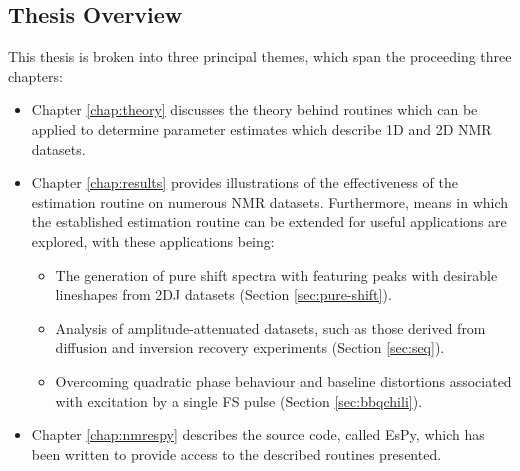 \subsection{Thesis Overview}
This thesis is broken into three principal themes, which span the proceeding
three chapters:
\begin{itemize}
    \item Chapter \ref{chap:theory} discusses the theory behind routines which
        can be applied to determine parameter estimates which describe \ac{1D}
        and \ac{2D} \ac{NMR} datasets.
    \item Chapter \ref{chap:results} provides illustrations of the effectiveness
        of the estimation routine on numerous \ac{NMR} datasets. Furthermore,
        means in which the established estimation routine can be extended for
        useful applications are explored, with these applications being:
        \begin{itemize}
            \item The generation of pure shift spectra with featuring peaks
                with desirable lineshapes from \ac{2DJ} datasets (Section
                \ref{sec:pure-shift}).
            \item Analysis of amplitude-attenuated datasets, such as those
                derived from diffusion and inversion recovery experiments
                (Section \ref{sec:seq}).
            \item Overcoming quadratic phase behaviour and baseline distortions
                associated with excitation by a single \acl{FS} pulse (Section
                \ref{sec:bbqchili}).
        \end{itemize}
    \item Chapter \ref{chap:nmrespy} describes the source code, called
        \acs{EsPy}, which has been written to provide access to the described
        routines presented.
\end{itemize}

